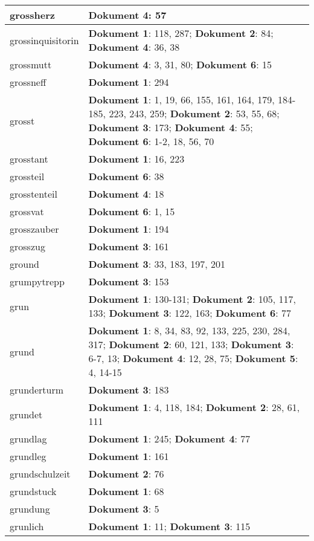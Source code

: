 \documentclass[a5paper]{article}
\begin{document}
\begin{longtable}[l]{|l|p{3in}|}
grossherz & \textbf{Dokument 4}: 57 \\
\hline
grossinquisitorin & \textbf{Dokument 1}: 118, 287; \textbf{Dokument 2}: 84; \textbf{Dokument 4}: 36, 38 \\
\hline
grossmutt & \textbf{Dokument 4}: 3, 31, 80; \textbf{Dokument 6}: 15 \\
\hline
grossneff & \textbf{Dokument 1}: 294 \\
\hline
grosst & \textbf{Dokument 1}: 1, 19, 66, 155, 161, 164, 179, 184-185, 223, 243, 259; \textbf{Dokument 2}: 53, 55, 68; \textbf{Dokument 3}: 173; \textbf{Dokument 4}: 55; \textbf{Dokument 6}: 1-2, 18, 56, 70 \\
\hline
grosstant & \textbf{Dokument 1}: 16, 223 \\
\hline
grossteil & \textbf{Dokument 6}: 38 \\
\hline
grosstenteil & \textbf{Dokument 4}: 18 \\
\hline
grossvat & \textbf{Dokument 6}: 1, 15 \\
\hline
grosszauber & \textbf{Dokument 1}: 194 \\
\hline
grosszug & \textbf{Dokument 3}: 161 \\
\hline
ground & \textbf{Dokument 3}: 33, 183, 197, 201 \\
\hline
grumpytrepp & \textbf{Dokument 3}: 153 \\
\hline
grun & \textbf{Dokument 1}: 130-131; \textbf{Dokument 2}: 105, 117, 133; \textbf{Dokument 3}: 122, 163; \textbf{Dokument 6}: 77 \\
\hline
grund & \textbf{Dokument 1}: 8, 34, 83, 92, 133, 225, 230, 284, 317; \textbf{Dokument 2}: 60, 121, 133; \textbf{Dokument 3}: 6-7, 13; \textbf{Dokument 4}: 12, 28, 75; \textbf{Dokument 5}: 4, 14-15 \\
\hline
grunderturm & \textbf{Dokument 3}: 183 \\
\hline
grundet & \textbf{Dokument 1}: 4, 118, 184; \textbf{Dokument 2}: 28, 61, 111 \\
\hline
grundlag & \textbf{Dokument 1}: 245; \textbf{Dokument 4}: 77 \\
\hline
grundleg & \textbf{Dokument 1}: 161 \\
\hline
grundschulzeit & \textbf{Dokument 2}: 76 \\
\hline
grundstuck & \textbf{Dokument 1}: 68 \\
\hline
grundung & \textbf{Dokument 3}: 5 \\
\hline
grunlich & \textbf{Dokument 1}: 11; \textbf{Dokument 3}: 115 \\

\end{longtable}
\end{document}
